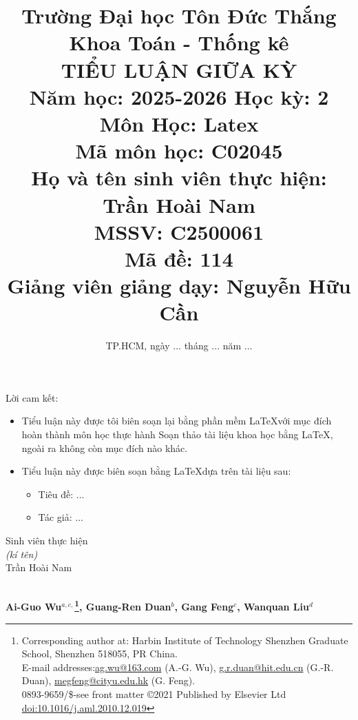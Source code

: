 \documentclass[12pt,a4paper,fleqn,twoside]{article}
\title{\large Trường Đại học Tôn Đức Thắng\\
 Khoa Toán - Thống kê\\[2em]
 TIỂU LUẬN GIỮA KỲ\\
 Năm học: 2025-2026 Học kỳ: 2\\
Môn Học: Latex\\
Mã môn học: C02045\\[2em]
Họ và tên sinh viên thực hiện: Trần Hoài Nam\\
MSSV: C2500061\\
Mã đề: 114\\[2em]
Giảng viên giảng dạy: Nguyễn Hữu Cần}
\date{TP.HCM, ngày ... tháng ... năm ...}
\renewcommand{\proofname}{\textnormal{\textbf{proof}}}
\theoremstyle{plain}
\begin{document}
	\maketitle
	\renewcommand{\thesection}{\arabic{section}.}
	\renewcommand{\thesubsection}{\thesection\arabic{subsection}.}
	\renewcommand{\proofname}{\textnormal{\textbf{Proof}}}
	\thispagestyle{empty}
	\newpage
	\thispagestyle{empty}

	Lời cam kết:
	\begin{itemize}
		\item[-] Tiểu luận này được tôi biên soạn lại bằng phần mềm \LaTeX với mục đích hoàn
		thành môn học thực hành Soạn thảo tài liệu khoa học bằng \LaTeX, ngoài ra
		không còn mục đích nào khác.
		\item[-] Tiểu luận này được biên soạn bằng \LaTeX dựa trên tài liệu sau:
		\begin{itemize}
			\item[+] Tiêu đề: ...
			\item[+] Tác giả: ...
		\end{itemize}
	\end{itemize}
	\begin{flushright}
		\begin{minipage}{0.4\textwidth}
			\centering
			Sinh viên thực hiện\\[0.5cm]
			\textit{(kí tên)}\\[0.5cm]
			Trần Hoài Nam
		\end{minipage}
	\end{flushright}
	\newpage
	\setcounter{page}{735}
	\thispagestyle{special}
	\renewcommand{\thefootnote}{$*$}
	\\[1em]
	{\large \textbf{Ai-Guo Wu$^{\hyperref[a]{a},\hyperref[c]{c},}$\footnote{\scriptsize Corresponding author at: Harbin Institute of Technology Shenzhen Graduate School, Shenzhen 518055, PR China.\\
			\hspace*{1.8em} E-mail addresses:\href{mailto:ag.wu@163.com}{ag.wu@163.com} (A.-G. Wu), \href{mailto:g.r.duan@hit.edu.cn}{g.r.duan@hit.edu.cn} (G.-R. Duan), \href{mailto:megfeng@cityu.edu.hk}{megfeng@cityu.edu.hk} (G. Feng).\\[1em]
			0893-9659/\$-see front matter \copyright 2021 Published by Elsevier Ltd\\ \href{https://doi.org/10.1016/j.aml.2010.12.019}{doi:10.1016/j.aml.2010.12.019}}, 
			Guang-Ren Duan$^{\hyperref[b]{b}}$, Gang Feng$^{\hyperref[c]{c}}$, Wanquan Liu$^{\hyperref[d]{d}}$}}\\[0.5 em]
\end{document}
